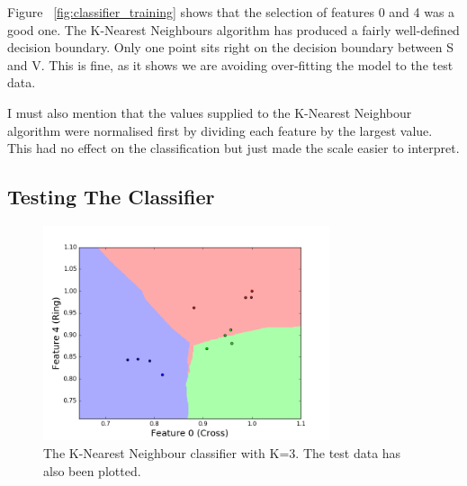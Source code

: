 \documentclass[11pt, a4paper]{article}
\begin{document}
Figure ~\ref{fig:classifier_training} shows that the selection of features 0 and 4 was a good one. The K-Nearest Neighbours algorithm has produced a fairly well-defined decision boundary. Only one point sits right on the decision boundary between S and V. This is fine, as it shows we are avoiding over-fitting the model to the test data.

I must also mention that the values supplied to the K-Nearest Neighbour  algorithm were normalised first by dividing each feature by the largest value. This had no effect on the classification but just made the scale easier to interpret.


\subsection{Testing The Classifier}

\begin{figure}[ht]
	\centering
	\includegraphics[trim={0 0 0 1cm},clip,width=0.75\textwidth]{test_plot.png}
	\caption{The K-Nearest Neighbour classifier with K=3. The test data has also been plotted.}
	\label{fig:classifier_test}
\end{figure}
\end{document}
